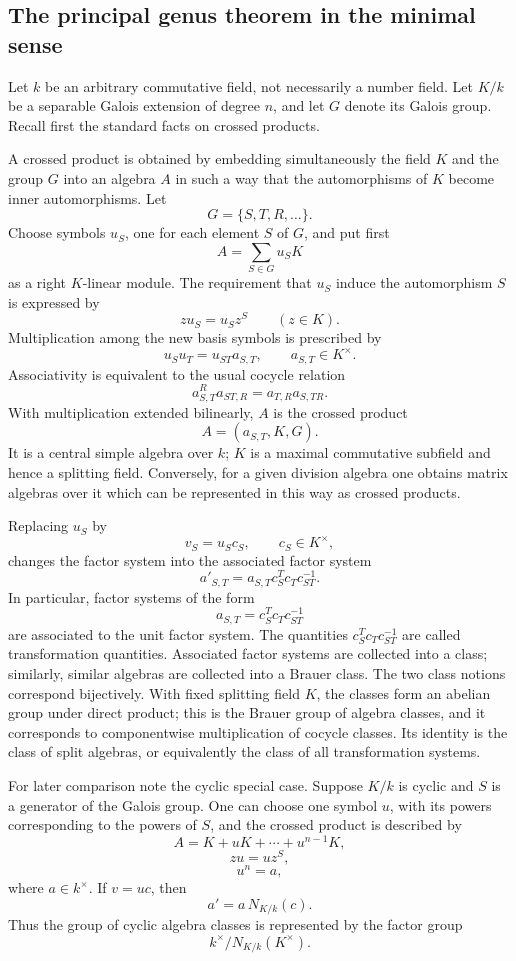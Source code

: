 \documentclass[11pt]{article}
\begin{document}
\subsection{The principal genus theorem in the minimal sense}

Let \(k\) be an arbitrary commutative field, not necessarily a number field. Let \(K/k\) be a separable Galois extension of degree \(n\), and let \(G\) denote its Galois group. Recall first the standard facts on crossed products.

A crossed product is obtained by embedding simultaneously the field \(K\) and the group \(G\) into an algebra \(A\) in such a way that the automorphisms of \(K\) become inner automorphisms. Let
\[
  G=\{S,T,R,\ldots\}.
\]
Choose symbols \(u_S\), one for each element \(S\) of \(G\), and put first
\[
  A=\sum_{S\in G} u_S K
\]
as a right \(K\)-linear module. The requirement that \(u_S\) induce the automorphism \(S\) is expressed by
\[
  z u_S = u_S z^S\qquad(z\in K).
\]
Multiplication among the new basis symbols is prescribed by
\[
  u_S u_T = u_{ST} a_{S,T},\qquad a_{S,T}\in K^{\times} .
\]
Associativity is equivalent to the usual cocycle relation
\[
  a_{S,T}^{R} a_{ST,R}=a_{T,R}a_{S,TR}.
\]
With multiplication extended bilinearly, \(A\) is the crossed product
\[
  A=(a_{S,T},K,G).
\]
It is a central simple algebra over \(k\); \(K\) is a maximal commutative subfield and hence a splitting field. Conversely, for a given division algebra one obtains matrix algebras over it which can be represented in this way as crossed products.

Replacing \(u_S\) by
\[
  v_S=u_S c_S,\qquad c_S\in K^{\times},
\]
changes the factor system into the associated factor system
\[
  a'_{S,T}=a_{S,T}c_S^T c_T c_{ST}^{-1}.
\]
In particular, factor systems of the form
\[
  a_{S,T}=c_S^T c_T c_{ST}^{-1}
\]
are associated to the unit factor system. The quantities \(c_S^T c_T c_{ST}^{-1}\) are called transformation quantities. Associated factor systems are collected into a class; similarly, similar algebras are collected into a Brauer class. The two class notions correspond bijectively. With fixed splitting field \(K\), the classes form an abelian group under direct product; this is the Brauer group of algebra classes, and it corresponds to componentwise multiplication of cocycle classes. Its identity is the class of split algebras, or equivalently the class of all transformation systems.

For later comparison note the cyclic special case. Suppose \(K/k\) is cyclic and \(S\) is a generator of the Galois group. One can choose one symbol \(u\), with its powers corresponding to the powers of \(S\), and the crossed product is described by
\[
  A=K+uK+\cdots+u^{n-1}K,
\]
\[
  zu=uz^S,
\]
\[
  u^n=a,
\]
where \(a\in k^{\times}\). If \(v=uc\), then
\[
  a'=a\,N_{K/k}(c).
\]
Thus the group of cyclic algebra classes is represented by the factor group
\[
  k^{\times}/N_{K/k}(K^{\times}).
\]
\end{document}
